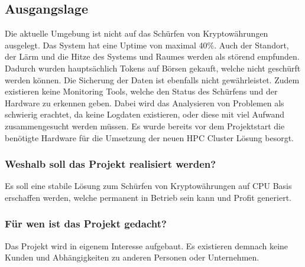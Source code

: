 
\subsection{Ausgangslage}
Die aktuelle Umgebung ist nicht auf das Schürfen von Kryptowährungen ausgelegt. Das System hat eine Uptime von maximal 40\%. Auch der Standort, der Lärm und die Hitze des Systems und Raumes werden als störend empfunden. Dadurch wurden hauptsächlich Tokens auf Börsen gekauft, welche nicht geschürft werden können. Die Sicherung der Daten ist ebenfalls nicht gewährleistet. Zudem existieren keine Monitoring Tools, welche den Status des Schürfens und der Hardware zu erkennen geben. Dabei wird das Analysieren von Problemen als schwierig erachtet, da keine Logdaten existieren, oder diese mit viel Aufwand zusammengesucht werden müssen. Es wurde bereits vor dem Projektstart die benötigte Hardware für die Umsetzung der neuen HPC Cluster Lösung besorgt.


\subsubsection{Weshalb soll das Projekt realisiert werden?}
Es soll eine stabile Lösung zum Schürfen von Kryptowährungen auf CPU Basis erschaffen werden, welche permanent in Betrieb sein kann und Profit generiert.

\subsubsection{Für wen ist das Projekt gedacht?}
Das Projekt wird in eigenem Interesse aufgebaut. Es existieren demnach keine Kunden und Abhängigkeiten zu anderen Personen oder Unternehmen.

